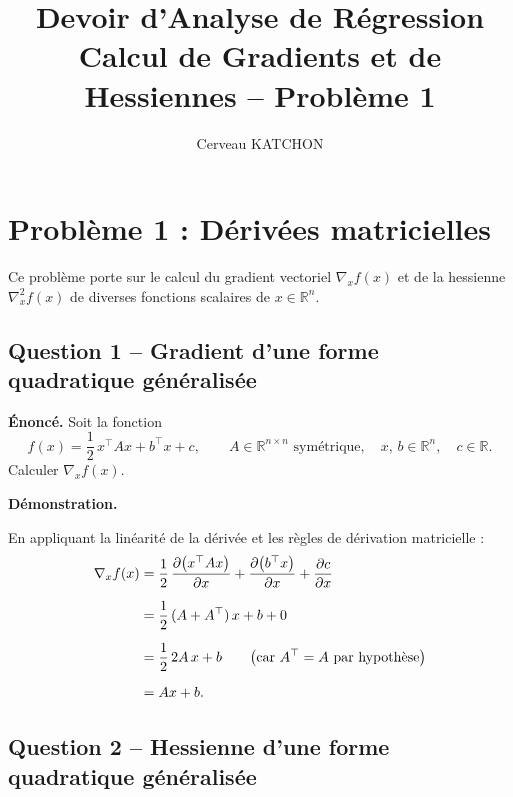 \documentclass[12pt,a4paper]{article}
\title{\textbf{Devoir d'Analyse de Régression}\\[0.4em]
       \large Calcul de Gradients et de Hessiennes -- Problème 1}
\author{Cerveau KATCHON}
\date{}
\newcommand{\R}{\mathbb{R}}
\newcommand{\grad}{\nabla}
\begin{document}
\maketitle
\thispagestyle{fancy}

\section*{Problème 1 : Dérivées matricielles}

Ce problème porte sur le calcul du gradient vectoriel $\grad_x f(x)$ et de la
hessienne $\grad_x^2 f(x)$ de diverses fonctions scalaires de $x \in \R^n$.

\subsection*{Question 1 -- Gradient d'une forme quadratique généralisée}

\textbf{Énoncé.}
Soit la fonction
\[
  f(x) = \frac{1}{2}\,x^{\top} A x + b^{\top} x + c,
  \qquad
  A \in \R^{n \times n} \text{ symétrique},\quad
  x,\, b \in \R^{n},\quad
  c \in \R.
\]
Calculer $\grad_x f(x)$.

\medskip
\textbf{Démonstration.}

En appliquant la linéarité de la dérivée et les règles de dérivation matricielle :
\begin{align}
  \grad_x f(x)
    &= \frac{1}{2}\,\frac{\partial\bigl(x^{\top} A x\bigr)}{\partial x}
       + \frac{\partial\bigl(b^{\top} x\bigr)}{\partial x}
       + \frac{\partial c}{\partial x} \notag\\[6pt]
    &= \frac{1}{2}\,(A + A^{\top})\,x + b + 0 \notag\\[6pt]
    &= \frac{1}{2}\,2A\,x + b
       \qquad \bigl(\text{car } A^{\top} = A \text{ par hypothèse}\bigr) \notag\\[6pt]
    &= Ax + b. \notag
\end{align}

\medskip
\begin{center}
  \fbox{$\displaystyle \grad_x f(x) = Ax + b$}
\end{center}

\subsection*{Question 2 -- Hessienne d'une forme quadratique généralisée}
\end{document}
